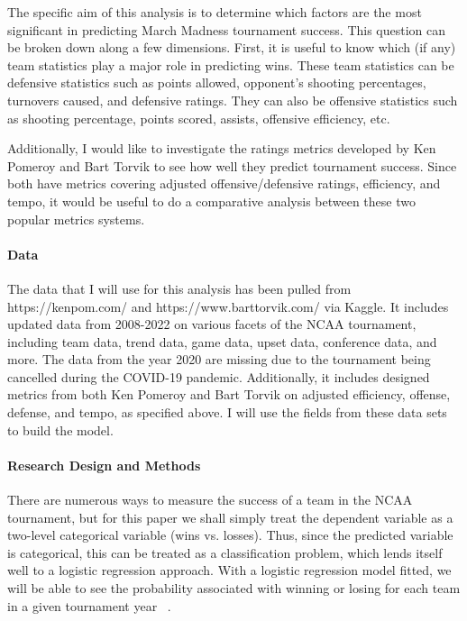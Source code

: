 \documentclass[12pt]{article}
\begin{document}
The specific aim of this analysis is to determine which factors are the most significant in predicting March Madness tournament success.  This question can be broken down along a few dimensions.  First, it is useful to know which (if any) team statistics play a major role in predicting wins.  These team statistics can be defensive statistics such as points allowed, opponent's shooting percentages, turnovers caused, and defensive ratings.  They can also be offensive statistics such as shooting percentage, points scored, assists, offensive efficiency, etc.  

Additionally, I would like to investigate the ratings metrics developed by Ken Pomeroy and Bart Torvik to see how well they predict tournament success.  Since both have metrics covering adjusted offensive/defensive ratings, efficiency, and tempo, it would be useful to do a comparative analysis between these two popular metrics systems.  

\paragraph{Data}

The data that I will use for this analysis has been pulled from https://kenpom.com/ and https://www.barttorvik.com/ via Kaggle.  It includes updated data from 2008-2022 on various facets of the NCAA tournament, including team data, trend data, game data, upset data, conference data, and more.  The data from the year 2020 are missing due to the tournament being cancelled during the COVID-19 pandemic.  Additionally, it includes designed metrics from both Ken Pomeroy and Bart Torvik on adjusted efficiency, offense, defense, and tempo, as specified above.  I will use the fields from these data sets to build the model.  

\paragraph{Research Design and Methods}

There are numerous ways to measure the success of a team in the NCAA tournament, but for this paper we shall simply treat the dependent variable as a two-level categorical variable (wins vs. losses).  Thus, since the predicted variable is categorical, this can be treated as a classification problem, which lends itself well to a logistic regression approach.  With a logistic regression model fitted, we will be able to see the probability associated with winning or losing for each team in a given tournament year ~\citep{fonseca2018march}. 
\end{document}

